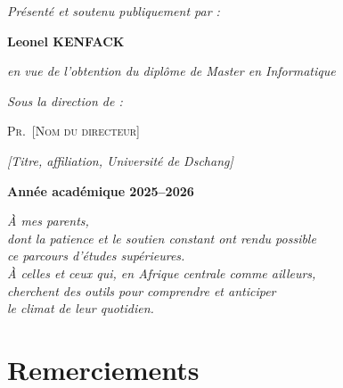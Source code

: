 \documentclass[14pt,a4paper,openany]{extreport}
\theoremstyle{definition}
\begin{document}
\begin{titlepage}
\vspace{2.5em}
{\large \textit{Présenté et soutenu publiquement par :} \par}
\vspace{0.5em}
{\Large\bfseries Leonel KENFACK \par}
\vspace{0.2em}
{\normalsize \textit{en vue de l'obtention du diplôme de Master en Informatique} \par}

\vspace{2em}
{\large \textit{Sous la direction de :} \par}
\vspace{0.4em}
{\large \textsc{Pr.~[Nom du directeur]} \par}
{\small \textit{[Titre, affiliation, Université de Dschang]} \par}

\vspace{1.5em}
{\large \textbf{Année académique 2025--2026} \par}

\end{titlepage}

\clearpage
\thispagestyle{empty}
\vspace*{4cm}
\begin{flushright}
\textit{À mes parents,}\\[0.5em]
\textit{dont la patience et le soutien constant ont rendu possible}\\[0.3em]
\textit{ce parcours d'études supérieures.}\\[1em]
\textit{À celles et ceux qui, en Afrique centrale comme ailleurs,}\\[0.3em]
\textit{cherchent des outils pour comprendre et anticiper}\\[0.3em]
\textit{le climat de leur quotidien.}\\[2em]
\end{flushright}

\clearpage
\chapter*{Remerciements}
\end{document}
